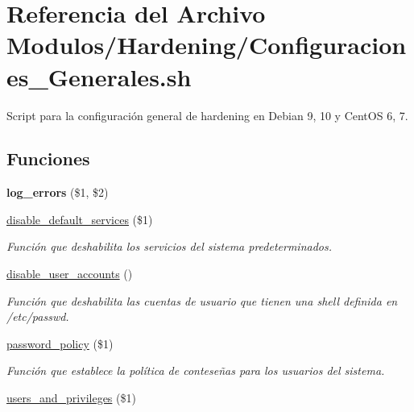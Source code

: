 \hypertarget{Configuraciones__Generales_8sh}{}\section{Referencia del Archivo Modulos/\+Hardening/\+Configuraciones\+\_\+\+Generales.sh}
\label{Configuraciones__Generales_8sh}


Script para la configuración general de hardening en Debian 9, 10 y Cent\+OS 6, 7.  


\subsection*{Funciones}
\begin{DoxyCompactItemize}
\item 
\mbox{\label{Configuraciones__Generales_8sh_a92067b58a8478c9841b2cd9b75ea3565}} 
{\bfseries log\+\_\+errors} (\$1, \$2)
\item 
\hyperlink{Configuraciones__Generales_8sh_ad83bd5e5089ad1546035126564e2a5d1}{disable\+\_\+default\+\_\+services} (\$1)
\begin{DoxyCompactList}\small\item\em Función que deshabilita los servicios del sistema predeterminados. \end{DoxyCompactList}\item 
\mbox{\label{Configuraciones__Generales_8sh_af9950a47b946dd1e1d14b44a39ad3a7d}} 
\hyperlink{Configuraciones__Generales_8sh_af9950a47b946dd1e1d14b44a39ad3a7d}{disable\+\_\+user\+\_\+accounts} ()
\begin{DoxyCompactList}\small\item\em Función que deshabilita las cuentas de usuario que tienen una shell definida en /etc/passwd. \end{DoxyCompactList}\item 
\hyperlink{Configuraciones__Generales_8sh_ac4fb2a5b8684da33e70460b3b419f32d}{password\+\_\+policy} (\$1)
\begin{DoxyCompactList}\small\item\em Función que establece la política de conteseñas para los usuarios del sistema. \end{DoxyCompactList}\item 
\hyperlink{Configuraciones__Generales_8sh_a1fc4ba4932f2393664a8130399016a15}{users\+\_\+and\+\_\+privileges} (\$1)

\end{DoxyCompactItemize}
